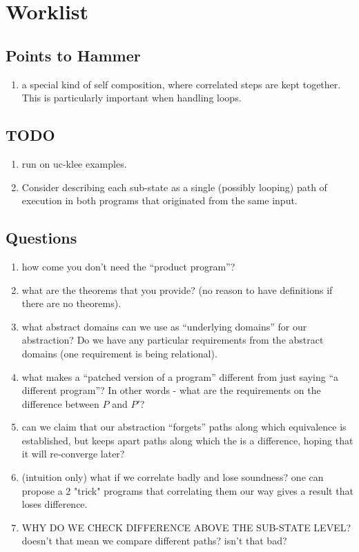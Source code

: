 \section{Worklist}

\subsection{Points to Hammer}

\begin{enumerate}
\item a special kind of self composition, where correlated steps are kept together. This is particularly important when handling loops.
\end{enumerate}

\subsection{TODO}
\begin{enumerate}
\item run on uc-klee examples.
\item Consider describing each sub-state as a single (possibly looping) path of execution in both programs that originated from the same input.
\end{enumerate}


\subsection{Questions}

\begin{enumerate}
\item how come you don't need the ``product program''?
\item what are the theorems that you provide? (no reason to have definitions if there are no theorems).
\item what abstract domains can we use as ``underlying domains'' for our abstraction? Do we have any particular requirements from the abstract domains (one requirement is being relational).
\item what makes a ``patched version of a program'' different from just saying ``a different program''? In other words - what are the requirements on the difference between $P$ and $P'$?
\item can we claim that our abstraction ``forgets'' paths along which equivalence is established, but keeps apart paths along which the is a difference, hoping that it will re-converge later?
\item (intuition only) what if we correlate badly and lose soundness? one can propose a 2 "trick" programs that correlating them our way gives a result that loses difference.
\item WHY DO WE CHECK DIFFERENCE ABOVE THE SUB-STATE LEVEL? doesn't that mean we compare different paths? isn't that bad?
\end{enumerate}

